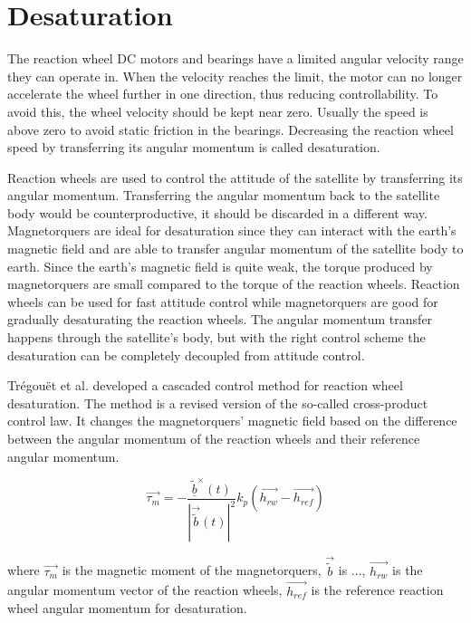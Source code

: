 \section{Desaturation}

The reaction wheel DC motors and bearings have a limited angular velocity range they can operate in. When the velocity reaches the limit, the motor can no longer accelerate the wheel further in one direction, thus reducing controllability. To avoid this, the wheel velocity should be kept near zero. Usually the speed is above zero to avoid static friction in the bearings. Decreasing the reaction wheel speed by transferring its angular momentum is called desaturation.

Reaction wheels are used to control the attitude of the satellite by transferring its angular momentum. Transferring the angular momentum back to the satellite body would be counterproductive, it should be discarded in a different way. Magnetorquers are ideal for desaturation since they can interact with the earth's magnetic field and are able to transfer angular momentum of the satellite body to earth. Since the earth's magnetic field is quite weak, the torque produced by magnetorquers are small compared to the torque of the reaction wheels. Reaction wheels can be used for fast attitude control while magnetorquers are good for gradually desaturating the reaction wheels. The angular momentum transfer happens through the satellite's body, but with the right control scheme the desaturation can be  completely decoupled from attitude control.

Trégouët et al. \cite{DesatTregouet} developed a cascaded control method for reaction wheel desaturation. The method is a revised version of the so-called cross-product control law. It changes the magnetorquers' magnetic field based on the difference between the angular momentum of the reaction wheels and their reference angular momentum.

\begin{equation}
\vec{\tau_m} = -\frac{\underline{\tilde{b}}^\times(t)}{|\vec{\tilde{b}}(t) |^2} k_p\left(\vec{h_{rw}} - \vec{h_{ref}} \right)
\end{equation}

where $\vec{\tau_m}$ is the magnetic moment of the magnetorquers, $\vec{\tilde{b}}$ is ..., $\vec{h_{rw}}$ is the angular momentum vector of the reaction wheels, $\vec{h_{ref}}$ is the reference reaction wheel angular momentum for desaturation.
		

